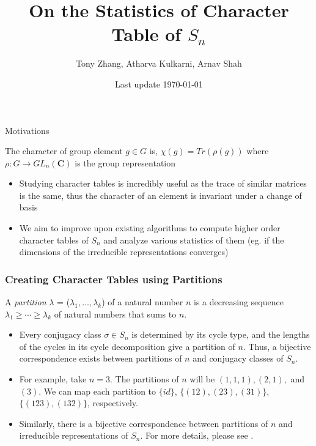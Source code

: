\documentclass{beamer}
\title[University of Michigan LoG(M)]{On the Statistics of Character Table of $S_n$}
\author{Tony Zhang, Atharva Kulkarni, Arnav Shah}
\institute{University of Michigan}
\date{Last update \today}
\begin{document}
\begin{frame}
\titlepage
\end{frame}

\begin{frame}{Motivations}
    \begin{definition}
        The character of group element $g \in G$ is, $\chi(g) = Tr(\rho(g))$ where $\rho: G \rightarrow GL_n(\mathbf{C})$ is the group representation \cite{diaconis}
    \end{definition}
    \begin{itemize}
        \item Studying character tables is incredibly useful as the trace of similar matrices is the same, thus the character of an element is invariant under a change of basis
        \item We aim to improve upon existing algorithms to compute higher order character tables of $S_n$ and analyze various statistics of them (eg. if the dimensions of the irreducible representations converges) 
    \end{itemize}
\end{frame}

\begin{frame}
\frametitle{Creating Character Tables using Partitions}
\begin{definition} 
    A \textit{partition} $\lambda$ = ($\lambda_{1}, \dotsc, \lambda_{k}$) of a natural number $n$ is a decreasing sequence $\lambda_{1} \geq \dotsb \geq \lambda_{k}$ of natural numbers that sums to $n$.
    \label{def:partition} 
\end{definition}

\begin{itemize}
    \item Every conjugacy class $\sigma \in S_{n}$ is determined by its cycle type, and the lengths of the cycles in its cycle decomposition give a partition of $n$. Thus, a bijective correspondence exists between partitions of $n$ and conjugacy classes of $S_{n}$. 
    \item For example, take $n=3$. The partitions of $n$ will be $(1,1,1), (2,1),$ and $(3)$. We can map each partition to $\{id\}$, $\{(12), (23), (31)\}$, $\{(123), (132)\}$, respectively.
    \item Similarly, there is a bijective correspondence between partitions of $n$ and irreducible representations of $S_{n}$. For more details, please see \cite{Zhao08youngta}.
\end{itemize}
\end{frame}
\end{document}
